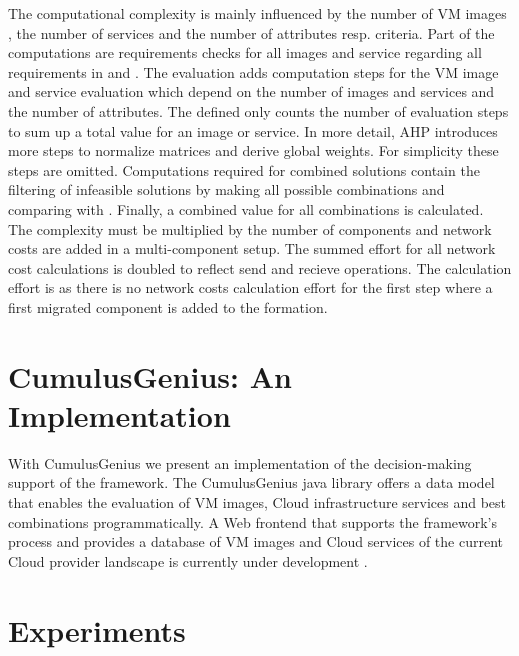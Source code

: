 \documentclass[10pt]{article}
\begin{document}
The computational complexity is mainly influenced by the number of VM images , the number of services  and the number of attributes resp. criteria. Part of the computations are requirements checks for all  images and  service regarding all requirements in  and . The evaluation adds computation steps for the VM image and service evaluation which depend on the number of images and services and the number of attributes. The defined  only counts the number of evaluation steps to sum up a total value for an image or service. In more detail, AHP introduces more steps to normalize matrices and derive global weights. For simplicity these steps are omitted. Computations required for combined solutions contain the filtering of infeasible solutions by making all possible  combinations and comparing with . Finally, a combined value for all combinations is calculated. 
The complexity must be multiplied by the number of components  and network costs are added in a multi-component setup. The summed effort for all network cost calculations is doubled to reflect send and recieve operations. The calculation effort is  as there is no network costs calculation effort for the first step where a first migrated component is added to the formation. 



\section{CumulusGenius: An Implementation}\label{prototype}

With CumulusGenius \cite{cumulusgenius2011} we present an implementation of the decision-making support of the framework. The CumulusGenius java library offers a data model that enables the evaluation of VM images, Cloud infrastructure services and best combinations programmatically. A Web frontend that supports the framework's process and provides a database of VM images and Cloud services of the current Cloud provider landscape is currently under development \cite{cumulusgeniusonline2011}.

\section{Experiments}\label{experiments}
\end{document}
